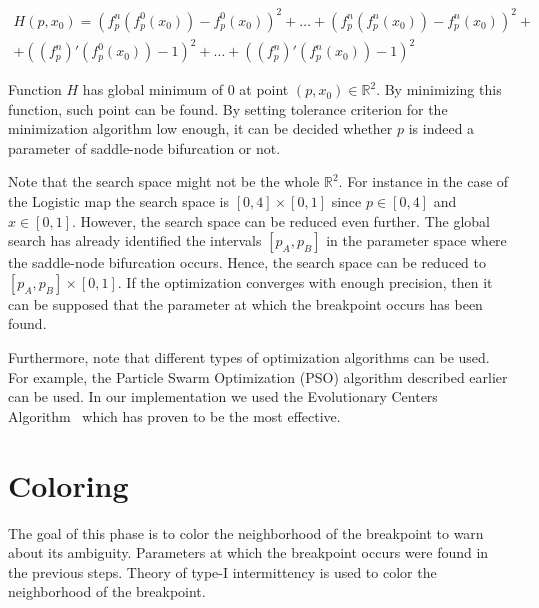 \begin{multline*} 
H(p, x_0) = (f_{p}^{n}(f_{p}^{0}(x_0)) - f_{p}^{0}(x_0))^2 + \dots + (f_{p}^{n}(f_{p}^{n}(x_0)) - f_{p}^{n}(x_0))^2 + \\
    + ((f_{p}^{n})'(f_{p}^{0}(x_0)) -1)^2 + \dots + ((f_{p}^{n})'(f_{p}^{n}(x_0)) -1)^2
\end{multline*}

Function $H$ has global minimum of $0$ at point $(p, x_0) \in \mathbb{R}^{2}$.
By minimizing this function, such point can be found.
By setting tolerance criterion for the minimization algorithm low enough, it can be decided whether $p$ is indeed a parameter of saddle-node bifurcation or not.
\par
Note that the search space might not be the whole $\mathbb{R}^{2}$.
For instance in the case of the Logistic map the search space is $[0, 4] \times [0, 1]$ since $p \in [0,4]$ and $x \in [0,1]$.
However, the search space can be reduced even further.
The global search has already identified the intervals $[p_A, p_B]$ in the parameter space where the saddle-node bifurcation occurs.
Hence, the search space can be reduced to $[p_A, p_B] \times [0, 1]$.
If the optimization converges with enough precision, then it can be supposed that the parameter at which the breakpoint occurs has been found.
\par
Furthermore, note that different types of optimization algorithms can be used.
For example, the Particle Swarm Optimization (PSO) algorithm described earlier can be used.
In our implementation we used the Evolutionary Centers Algorithm~\cite{MejiadeDios20190913} which has proven to be the most effective.

\section{Coloring}
The goal of this phase is to color the neighborhood of the breakpoint to warn about its ambiguity.
Parameters at which the breakpoint occurs were found in the previous steps.
Theory of type-I intermittency is used to color the neighborhood of the breakpoint.

